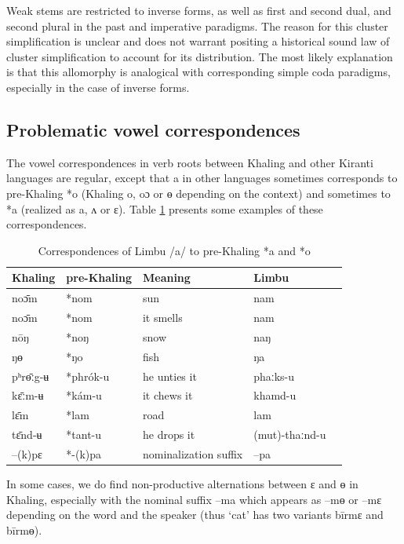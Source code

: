 \documentclass[oldfontcommands,oneside,a4paper,11pt]{article}
\newcommand{\ipa}[1]{{\phon \mbox{#1}}} %
\begin{document}
Weak stems are restricted to inverse forms, as well as first and second dual, and second plural in the past and imperative paradigms. The reason for this cluster simplification is unclear and does not warrant positing a historical sound law of cluster simplification to account for its distribution. The most likely explanation is that this allomorphy is analogical with corresponding simple coda paradigms, especially in the case of  inverse forms.


\subsection{Problematic vowel correspondences} \label{sec:vowel.correspondences}

The vowel correspondences in verb roots between Khaling and other Kiranti languages are regular, except that \ipa{a} in other languages sometimes corresponds to pre-Khaling  \ipa{*o} (Khaling \ipa{o}, \ipa{oɔ} or \ipa{ɵ} depending on the context) and sometimes to  \ipa{*a} (realized as \ipa{a}, \ipa{ʌ} or \ipa{ɛ}). Table \ref{tab:correspondances.a} presents some examples of these correspondences.
 
\begin{table}[H]
\caption{Correspondences of Limbu  /a/ to pre-Khaling  \ipa{*a} and  \ipa{*o}} \centering \label{tab:correspondances.a}
\begin{tabular}{lllll}
Khaling &   pre-Khaling & Meaning &   Limbu \\
\midrule
\ipa{noɔ̄m} &  \ipa{*nom} & sun &   \ipa{nam}\\
\ipa{noɔ̄m} &  \ipa{*nom} & it smells &   \ipa{nam}\\
\ipa{nōŋ} &  \ipa{*noŋ} & snow&   \ipa{naŋ}\\
\ipa{ŋɵ} &  \ipa{*ŋo} & fish&   \ipa{ŋa}\\
\ipa{pʰrɵ̄ːg-ʉ} &  \ipa{*phrók-u} & he unties it & \ipa{phaːks-u} \\
\midrule
\ipa{kɛ̄ːm-ʉ} &  \ipa{*kám-u} & it chews it & \ipa{khamd-u} \\
\ipa{lɛ̄m} &  \ipa{*lam} & road & \ipa{lam} \\
\ipa{tɛ̄nd-ʉ} & \ipa{*tant-u} & he drops it & \ipa{(mut)-thaːnd-u}\\
\ipa{--(k)pɛ} & \ipa{*-(k)pa} & nominalization suffix & \ipa{--pa} \\
\bottomrule
\end{tabular}
\end{table}
In some cases, we do find non-productive alternations between \ipa{ɛ} and \ipa{ɵ} in Khaling, especially with the nominal suffix \ipa{--ma} which appears as \ipa{--mɵ} or \ipa{--mɛ} depending on the word and the speaker (thus `cat' has two variants \ipa{bīrmɛ} and \ipa{bīrmɵ}). 
\end{document}
